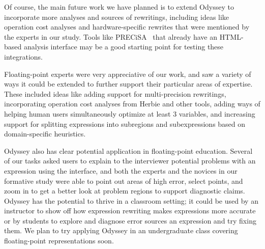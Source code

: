 

Of course, the main future work we have planned is to extend Odyssey to
  incorporate more analyses and sources of rewritings, including ideas like
  operation cost analyses and hardware-specific rewrites that were mentioned by
  the experts in our study.
Tools like PRECiSA~\cite{precisa} that already have an HTML-based analysis interface may be a good starting point 
  for testing these integrations. 

Floating-point experts were very appreciative of our work, and saw a variety of
  ways it could be extended to further support their particular areas of
  expertise.
These included ideas like adding support for multi-precision rewritings,
  incorporating operation cost analyses from Herbie and other tools, adding ways
  of helping human users simultaneously optimize at least 3 variables, and
  increasing support for splitting expressions into subregions and subexpressions
  based on domain-specific heuristics.


Odyssey also has clear potential application in floating-point education.
Several of our tasks asked users to explain to the interviewer potential
  problems with an expression using the interface, and both the experts and the
  novices in our formative study were able to point out areas of high error,
  select points, and zoom in to get a better look at problem regions to support
  diagnostic claims.
Odyssey has the potential to thrive in a classroom setting; it could be used by
  an instructor to show off how expression rewriting makes expressions more
  accurate or by students to explore and diagnose error sources an expression and
  try fixing them.
We plan to try applying Odyssey in an undergraduate class covering
  floating-point representations soon.

